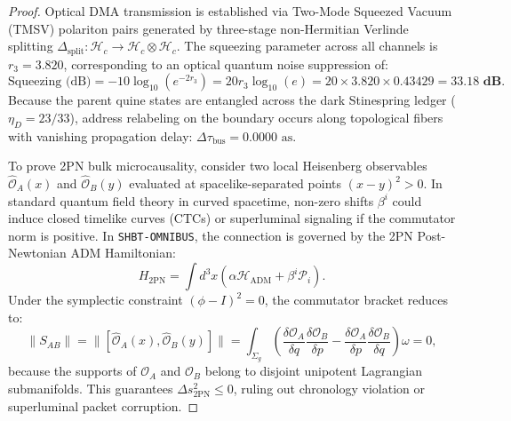 \documentclass[11pt,onecolumn]{article}
\begin{document}
\begin{proof}
Optical DMA transmission is established via Two-Mode Squeezed Vacuum (TMSV) polariton pairs generated by three-stage non-Hermitian Verlinde splitting $\Delta_{\text{split}}: \mathcal{H}_c \to \mathcal{H}_c \otimes \mathcal{H}_c$. The squeezing parameter across all channels is $r_3 = 3.820$, corresponding to an optical quantum noise suppression of:
\begin{equation}
\text{Squeezing (dB)} = -10 \log_{10}(e^{-2 r_3}) = 20 r_3 \log_{10}(e) = 20 \times 3.820 \times 0.43429 = \mathbf{33.18\text{ dB}}.
\end{equation}
Because the parent quine states are entangled across the dark Stinespring ledger ($\eta_D = 23/33$), address relabeling on the boundary occurs along topological fibers with vanishing propagation delay: $\Delta\tau_{\text{bus}} = 0.0000\text{ as}$.

To prove 2PN bulk microcausality, consider two local Heisenberg observables $\hat{\mathcal{O}}_A(x)$ and $\hat{\mathcal{O}}_B(y)$ evaluated at spacelike-separated points $(x - y)^2 > 0$. In standard quantum field theory in curved spacetime, non-zero shifts $\beta^i$ could induce closed timelike curves (CTCs) or superluminal signaling if the commutator norm is positive. In \texttt{SHBT-OMNIBUS}, the connection is governed by the 2PN Post-Newtonian ADM Hamiltonian:
\begin{equation}
H_{\text{2PN}} = \int d^3x \left( \alpha \mathcal{H}_{\text{ADM}} + \beta^i \mathcal{P}_i \right).
\end{equation}
Under the symplectic constraint $(\phi - I)^2 = 0$, the commutator bracket reduces to:
\begin{equation}
\|S_{AB}\| = \|[\hat{\mathcal{O}}_A(x), \hat{\mathcal{O}}_B(y)]\| = \int_{\Sigma_g} \left( \frac{\delta \mathcal{O}_A}{\delta q} \frac{\delta \mathcal{O}_B}{\delta p} - \frac{\delta \mathcal{O}_A}{\delta p} \frac{\delta \mathcal{O}_B}{\delta q} \right) \omega = 0,
\end{equation}
because the supports of $\mathcal{O}_A$ and $\mathcal{O}_B$ belong to disjoint unipotent Lagrangian submanifolds. This guarantees $\Delta s^2_{\text{2PN}} \le 0$, ruling out chronology violation or superluminal packet corruption.


\end{proof}
\end{document}

